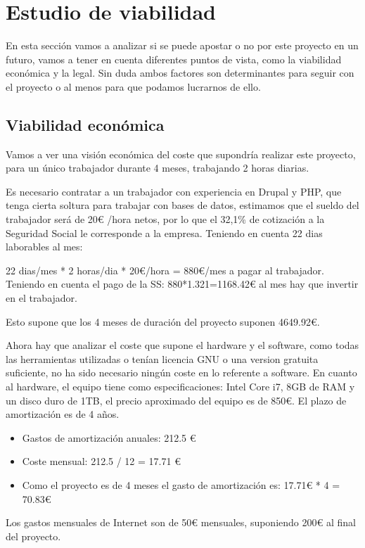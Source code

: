 \section{Estudio de viabilidad}
En esta sección vamos a analizar si se puede apostar o no por este proyecto en un futuro, vamos a tener en cuenta diferentes puntos de vista, como la viabilidad económica y la legal. Sin duda ambos factores son determinantes para seguir con el proyecto o al menos para que podamos lucrarnos de ello.


\subsection{Viabilidad económica}
Vamos a ver una visión económica del coste que supondría realizar este proyecto, para un único trabajador durante 4 meses, trabajando 2 horas diarias.

Es necesario contratar a un trabajador con experiencia en Drupal y PHP, que tenga cierta soltura para trabajar con bases de datos, estimamos que el sueldo del trabajador será de 20\euro{} /hora netos, por lo que el 32,1\% de cotización a la Seguridad Social \cite{cotizacion_ss} le corresponde a la empresa.
Teniendo en cuenta 22 dias laborables al mes:

22 dias/mes * 2 horas/dia * 20\euro/hora = 880\euro/mes a pagar al trabajador.
Teniendo en cuenta el pago de la SS:
880*1.321=1168.42\euro{} al mes hay que invertir en el trabajador.

Esto supone que los 4 meses de duración del proyecto suponen 4649.92\euro{}.

Ahora hay que analizar el coste que supone el hardware y el software, como todas las herramientas utilizadas o tenían licencia GNU o una version gratuita suficiente, no ha sido necesario ningún coste en lo referente a software.
En cuanto al hardware, el equipo tiene como especificaciones: Intel Core i7, 8GB de RAM y un disco duro de 1TB, el precio aproximado del equipo es de 850\euro{}. El plazo de amortización es de 4 años.

\begin{itemize}
\item Gastos de amortización anuales: 212.5 \euro{}
\item Coste mensual: 212.5 / 12 = 17.71 \euro{}
\item Como el proyecto es de 4 meses el gasto de amortización es: 17.71\euro{} * 4 = 70.83\euro{}
\end{itemize}

Los gastos mensuales de Internet son de 50\euro{} mensuales, suponiendo 200\euro{} al final del proyecto.

